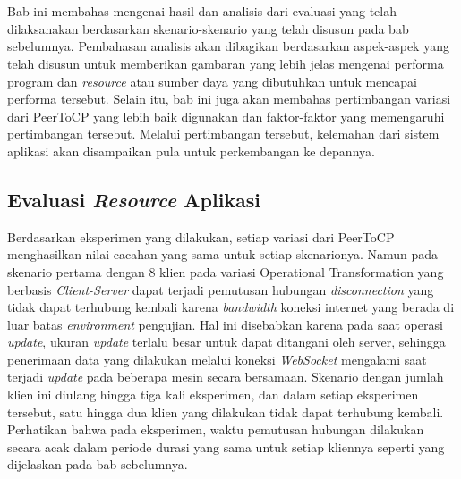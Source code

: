\chapter{\babLima}
\label{bab:5}

Bab ini membahas mengenai hasil dan analisis dari evaluasi yang telah dilaksanakan berdasarkan skenario-skenario yang telah disusun pada bab sebelumnya. Pembahasan analisis akan dibagikan berdasarkan aspek-aspek yang telah disusun untuk memberikan gambaran yang lebih jelas mengenai performa program dan \textit{resource} atau sumber daya yang dibutuhkan untuk mencapai performa tersebut. Selain itu, bab ini juga akan membahas pertimbangan variasi dari PeerToCP yang lebih baik digunakan dan faktor-faktor yang memengaruhi pertimbangan tersebut. Melalui pertimbangan tersebut, kelemahan dari sistem aplikasi akan disampaikan pula untuk perkembangan ke depannya.

\section{Evaluasi \textit{Resource} Aplikasi}

Berdasarkan eksperimen yang dilakukan, setiap variasi dari PeerToCP menghasilkan nilai cacahan yang sama untuk setiap skenarionya. Namun pada skenario pertama dengan 8 klien pada variasi Operational Transformation yang berbasis \textit{Client-Server} dapat terjadi pemutusan hubungan \textit{disconnection} yang tidak dapat terhubung kembali karena \textit{bandwidth} koneksi internet yang berada di luar batas \textit{environment} pengujian. Hal ini disebabkan karena pada saat operasi \textit{update}, ukuran \textit{update} terlalu besar untuk dapat ditangani oleh server, sehingga penerimaan data yang dilakukan melalui koneksi \textit{WebSocket} mengalami  saat terjadi \textit{update} pada beberapa mesin secara bersamaan. Skenario dengan jumlah klien ini diulang hingga tiga kali eksperimen, dan dalam setiap eksperimen tersebut, satu hingga dua klien yang dilakukan tidak dapat terhubung kembali. Perhatikan bahwa pada eksperimen, waktu pemutusan hubungan  dilakukan secara acak dalam periode durasi yang sama untuk setiap kliennya seperti yang dijelaskan pada bab sebelumnya.

